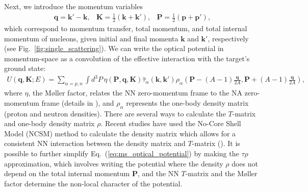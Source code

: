 \documentclass[preprintnumbers,floatfix,aps,prc,preprint,nofootinbib]{revtex4-1}
\begin{document}
Next, we introduce the momentum variables
%
\begin{subequations}
	\label{eq:momenta}
	\begin{eqnarray}
		\label{eq:momentum_transfer}
		\textbf{q} = \textbf{k}' - \textbf{k},
	\end{eqnarray}
	\begin{eqnarray}
		\label{eq:total_momentum}
		\textbf{K} = \frac{1}{2} ( \textbf{k} + \textbf{k}' ),
	\end{eqnarray}
	\begin{eqnarray}
		\label{eq:internal_momentum}
		\textbf{P} = \frac{1}{2} ( \textbf{p} + \textbf{p}' ),
	\end{eqnarray}
\end{subequations}
%
which correspond to momentum transfer, total momentum, and total internal momentum of nucleons, given initial and final momenta $\textbf{k}$ and $\textbf{k}'$, respectively (see Fig.~\ref{fig:single_scattering}). We can write the optical potential in momentum-space as a convolution of the effective interaction with the target's ground state:
%
\begin{eqnarray}
	\label{eq:ms_optical_potential}
	U(\textbf{q}, \textbf{K}; E) = \sum_{\alpha = p, n} \int d^3 P \, \eta(\textbf{P}, \textbf{q}, \textbf{K}) \hat{\tau}_{\alpha}(\textbf{k}, \textbf{k}') \rho_{\alpha}(\textbf{P} - (A-1) \frac{\textbf{q}}{2 A}, \textbf{P} + (A-1) \frac{\textbf{q}}{2 A}),
\end{eqnarray}
%
where $\eta$, the M\o ller factor, relates the NN zero-momentum frame to the NA zero-momentum frame (details in \cite{Elster:1996xh}), and $\rho_{\alpha}$ represents the one-body density matrix (proton and neutron densities). There are several ways to calculate the $T$-matrix and one-body density matrix $\rho$. Recent studies have used the No-Core Shell Model (NCSM) method to calculate the density matrix which allows for a consistent NN interaction between the density matrix and $T$-matrix (\cite{Burrows:2018ggt, Gennari:2017yez}). It is possible to further simplify Eq.~(\ref{eq:ms_optical_potential}) by making the $\tau \rho$ approximation, which involves writing the potential where the density $\rho$ does not depend on the total internal momentum $\textbf{P}$, and the NN $T$-matrix and the M\o ller factor determine the non-local character of the potential.
\\
\end{document}
